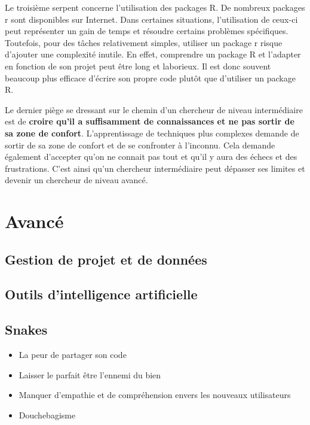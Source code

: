 \documentclass[
  letterpaper,
]{scrbook}
\begin{document}
Le troisième serpent concerne l'utilisation des packages R. De nombreux
packages r sont disponibles sur Internet. Dans certaines situations,
l'utilisation de ceux-ci peut représenter un gain de temps et résoudre
certains problèmes spécifiques. Toutefois, pour des tâches relativement
simples, utiliser un package r risque d'ajouter une complexité inutile.
En effet, comprendre un package R et l'adapter en fonction de son projet
peut être long et laborieux. Il est donc souvent beaucoup plus efficace
d'écrire son propre code plutôt que d'utiliser un package R.

Le dernier piège se dressant sur le chemin d'un chercheur de niveau
intermédiaire est de \textbf{croire qu'il a suffisamment de
connaissances et ne pas sortir de sa zone de confort}. L'apprentissage
de techniques plus complexes demande de sortir de sa zone de confort et
de se confronter à l'inconnu. Cela demande également d'accepter qu'on ne
connait pas tout et qu'il y aura des échecs et des frustrations. C'est
ainsi qu'un chercheur intermédiaire peut dépasser ses limites et devenir
un chercheur de niveau avancé.

\hypertarget{avancuxe9}{%
\section{Avancé}\label{avancuxe9}}

\hypertarget{gestion-de-projet-et-de-donnuxe9es}{%
\subsection{Gestion de projet et de
données}\label{gestion-de-projet-et-de-donnuxe9es}}

\hypertarget{outils-dintelligence-artificielle-1}{%
\subsection{Outils d'intelligence
artificielle}\label{outils-dintelligence-artificielle-1}}

\hypertarget{snakes}{%
\subsection{Snakes}\label{snakes}}

\begin{itemize}
\item
  La peur de partager son code
\item
  Laisser le parfait être l'ennemi du bien
\item
  Manquer d'empathie et de compréhension envers les nouveaux
  utilisateurs
\item
  Douchebagisme
\end{itemize}
\end{document}
